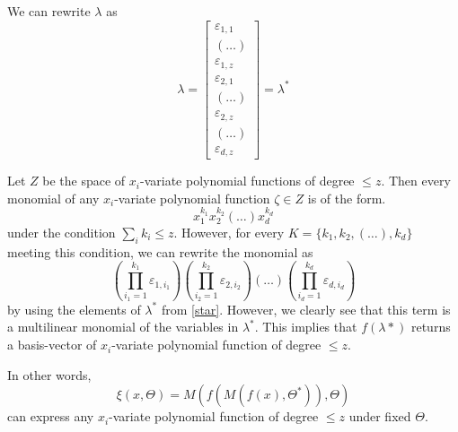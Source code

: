 \documentclass[11pt]{article}
\begin{document}
We can rewrite $\lambda$ as
\begin{equation} \label{star}
    \lambda 
    = 
    \begin{bmatrix}
        \varepsilon_{1, 1} \\
        (\dots) \\
        \varepsilon_{1, z} \\
        \varepsilon_{2, 1} \\
        (\dots) \\
        \varepsilon_{2, z} \\
        (\dots) \\
        \varepsilon_{d, z} 
    \end{bmatrix}
    = \lambda^*
\end{equation}

Let $Z$ be the space of $x_i$-variate polynomial functions 
of degree $\leq z$. Then every monomial of any $x_i$-variate polynomial function
$\zeta \in Z$ is of the form.
\begin{equation}
    x_{1}^{k_1}x_{2}^{k_2}(\dots)x_{d}^{k_d}
\end{equation}
under the condition $\sum_{i}k_i \leq z$. 
However, for every $K = \{k_1, k_2, (\dots), k_d\}$ meeting this condition,
we can rewrite the monomial as
\begin{equation}
    \left( \prod_{i_1=1}^{k_1}\varepsilon_{1, i_1} \right)
    \left( \prod_{i_2=1}^{k_2}\varepsilon_{2, i_2} \right)
    \left( \dots \right)
    \left( \prod_{i_d=1}^{k_d}\varepsilon_{d, i_d} \right)
\end{equation}
by using the elements of $\lambda^*$ from \eqref{star}.
However, we clearly see that this term is a multilinear 
monomial of the variables in $\lambda^*$. This implies that
$f(\lambda*)$ returns a basis-vector of $x_i$-variate polynomial 
function of degree $\leq z$.

In other words, 
\begin{equation}
    \xi \left( x, \Theta \right) =
        M
        \left(
            f
            \left(
                M
                \left(
                    f
                    \left(
                        x 
                    \right),
                    \Theta^*
                \right)
            \right),
            \Theta
        \right)
\end{equation}
can express any $x_i$-variate polynomial function of degree $\leq z$ under
fixed $\Theta$.
\end{document}
